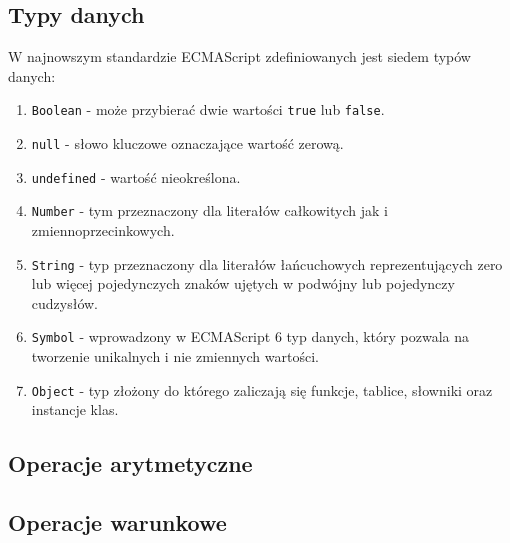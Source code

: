 \subsection{Typy danych}
\par W najnowszym standardzie ECMAScript zdefiniowanych jest siedem typów danych:
\begin{enumerate}
  \item \texttt{Boolean} - może przybierać dwie wartości \texttt{true} lub \texttt{false}.
  \item \texttt{null} - słowo kluczowe oznaczające wartość zerową. 
  \item \texttt{undefined} - wartość nieokreślona.
  \item \texttt{Number} - tym przeznaczony dla literałów całkowitych jak i zmiennoprzecinkowych.
  \item \texttt{String} - typ przeznaczony dla literałów łańcuchowych reprezentujących zero lub więcej pojedynczych znaków ujętych w podwójny lub pojedynczy cudzysłów.
  \item \texttt{Symbol} - wprowadzony w ECMAScript 6 typ danych, który pozwala na tworzenie unikalnych i nie zmiennych wartości.
  \item \texttt{Object} - typ złożony do którego zaliczają się funkcje, tablice, słowniki oraz instancje klas.
\end{enumerate}

\subsection{Operacje arytmetyczne}
\subsection{Operacje warunkowe}
